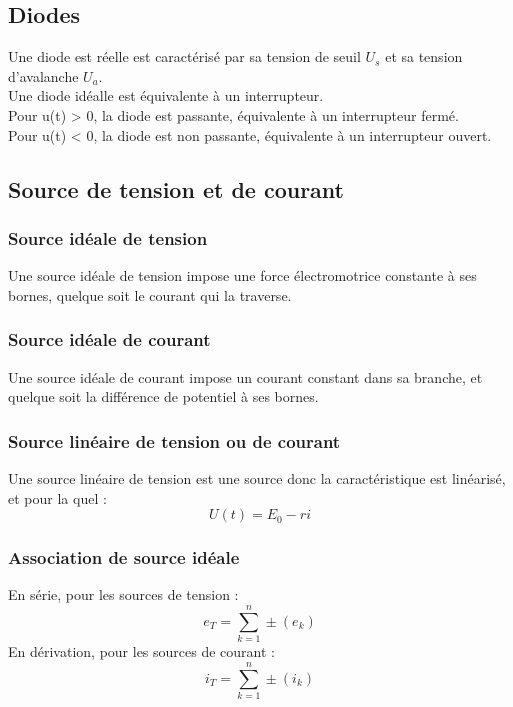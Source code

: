 \subsection{Diodes}
Une diode est réelle est caractérisé par sa tension de seuil $U_s$ et sa tension d'avalanche $U_a$.\\
Une diode idéalle est équivalente à un interrupteur.\\ Pour u(t) > 0, la diode est passante, équivalente à un interrupteur fermé.\\ Pour u(t) < 0, la diode est non passante, équivalente à un interrupteur ouvert.
\subsection{Source de tension et de courant}
\subsubsection{Source idéale de tension}
Une source idéale de tension impose une force électromotrice constante à ses bornes, quelque soit le courant qui la traverse.
\subsubsection{Source idéale de courant}
Une source idéale de courant impose un courant constant dans sa branche, et quelque soit la différence de potentiel à ses bornes.
\subsubsection{Source linéaire de tension ou de courant}
Une source linéaire de tension est une source donc la caractéristique est linéarisé, et pour la quel :
$$U(t) = E_0 - ri$$
\subsubsection{Association de source idéale}
En série, pour les sources de tension :
$$e_T = \sum_{k=1}^n \pm(e_k)$$
En dérivation, pour les sources de courant :
$$i_T = \sum_{k=1}^n \pm(i_k)$$
